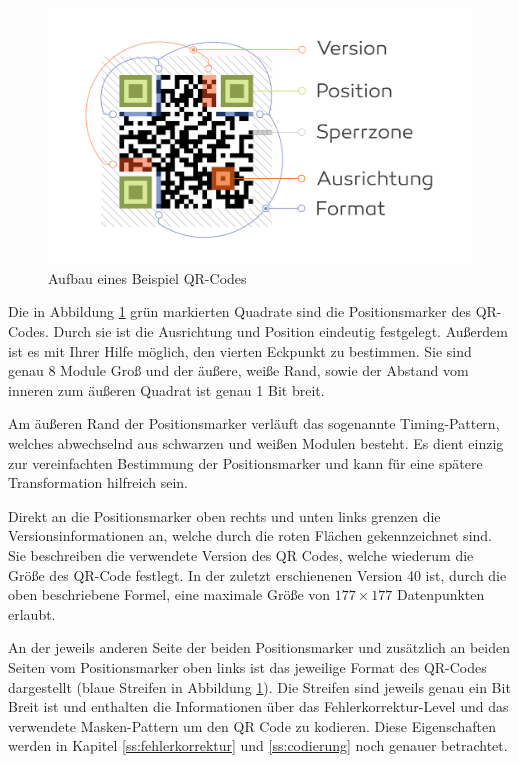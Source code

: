 \documentclass[a4paper, oneside, 12pt]{article}
\begin{document}
\begin{figure}[h]
	\includegraphics[width=\textwidth]{images/aufbau.png}
	\caption{Aufbau eines Beispiel QR-Codes}
	\label{fig:aufbau}
\end{figure}

Die in Abbildung \ref{fig:aufbau} grün markierten Quadrate sind die Positionsmarker des QR-Codes. Durch sie ist die Ausrichtung und Position eindeutig festgelegt. Außerdem ist es mit Ihrer Hilfe möglich, den vierten Eckpunkt zu bestimmen. Sie sind genau 8 Module Groß und der äußere, weiße Rand, sowie der Abstand vom inneren zum äußeren Quadrat ist genau 1 Bit breit.

Am äußeren Rand der Positionsmarker verläuft das sogenannte Timing-Pattern, welches abwechselnd aus schwarzen und weißen Modulen besteht. Es dient einzig zur vereinfachten Bestimmung der Positionsmarker und kann für eine spätere Transformation hilfreich sein.

Direkt an die Positionsmarker oben rechts und unten links grenzen die Versionsinformationen an,  welche durch die roten Flächen gekennzeichnet sind. Sie beschreiben die verwendete Version des QR Codes, welche wiederum die Größe des QR-Code festlegt. In der zuletzt erschienenen Version 40 ist, durch die oben beschriebene Formel, eine maximale Größe von $177 \times 177$ Datenpunkten erlaubt.

An der jeweils anderen Seite der beiden Positionsmarker und zusätzlich an beiden Seiten vom Positionsmarker oben links ist das jeweilige Format des QR-Codes dargestellt (blaue Streifen in Abbildung \ref{fig:aufbau}). Die Streifen sind jeweils genau ein Bit Breit ist und enthalten die Informationen über das Fehlerkorrektur-Level und das verwendete Masken-Pattern um den QR Code zu kodieren. Diese Eigenschaften werden in Kapitel \ref{ss:fehlerkorrektur} und \ref{ss:codierung} noch genauer  betrachtet.
\end{document}

